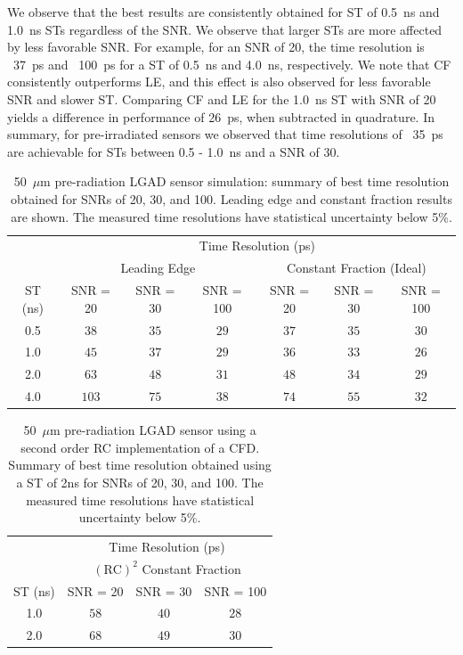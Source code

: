 \documentclass[preprint,1p]{elsarticle}
\begin{document}
We observe that the best results are consistently obtained for ST of 0.5~\si{ns} and 1.0~\si{ns} STs regardless of the SNR.
We observe that larger STs are more affected by less favorable SNR. For example, for an SNR of 20, the time resolution is ~37~\si{ps} and ~100~\si{ps} for a ST of 0.5~\si{ns} and 4.0~\si{ns}, respectively. We note that CF consistently outperforms
LE, and this effect is also observed for less favorable SNR and slower ST. Comparing CF and LE for the 1.0~\si{ns} ST
with SNR of 20 yields a difference in performance of 26~\si{ps}, when subtracted in quadrature. In summary, for
pre-irradiated sensors we observed that time resolutions of ~35~\si{ps} are achievable for
STs between 0.5 - 1.0~\si{ns} and a SNR of 30.

\begin{table}
    \begin{tabular}{c|ccc|ccc}
    \multicolumn{1}{c}{}& \multicolumn{6}{c}{Time Resolution (ps)} \\
    \multicolumn{1}{c}{}&\multicolumn{3}{c}{Leading Edge} & \multicolumn{3}{c}{Constant Fraction (Ideal)}\\ \hline
    ST (ns) & SNR = 20   & SNR = 30      & SNR = 100     & SNR = 20      & SNR = 30      & SNR = 100 \\
    0.5 & $38$    & $35$  & $29$  & $37$  & $35$  & $30$ \\
    1.0 & $45$    & $37$  & $29$  & $36$  & $33$  & $26$ \\
    2.0 & $63$    & $48$  & $31$  & $48$  & $34$  & $29$ \\
    4.0 & $103$  & $75$  & $38$  & $74$  & $55$  & $32$ \\
    \end{tabular}
    \caption{50~$\mu$m pre-radiation LGAD sensor simulation: summary of best time resolution obtained for SNRs
    of 20, 30, and 100. Leading edge and constant fraction results are shown. The measured time resolutions
    have statistical uncertainty below 5\%. }
    \label{tab:prerad}
 \end{table}


 \begin{table}
   \begin{center}
     \begin{tabular}{c|ccc}
     \multicolumn{1}{c}{}& \multicolumn{3}{c}{Time Resolution (ps)} \\
     \multicolumn{1}{c}{}& \multicolumn{3}{c}{$\mathrm{(RC)}^{2}$ Constant Fraction}\\ \hline
     ST (ns) & SNR = 20      & SNR = 30      & SNR = 100 \\
     1.0 & $58$  & $ 40$  & $28$ \\
     2.0 & $68$  & $ 49$  & $30$ \\
     \end{tabular}
     \caption{50~$\mu$m pre-radiation LGAD sensor using a second order RC implementation of a CFD.
     Summary of best time resolution obtained using a ST of 2\si{ns} for SNRs of 20, 30, and 100. The measured time resolutions
    have statistical uncertainty below 5\%.}
     \label{tab:prerad_psCFD}
   \end{center}
  \end{table}
\end{document}
